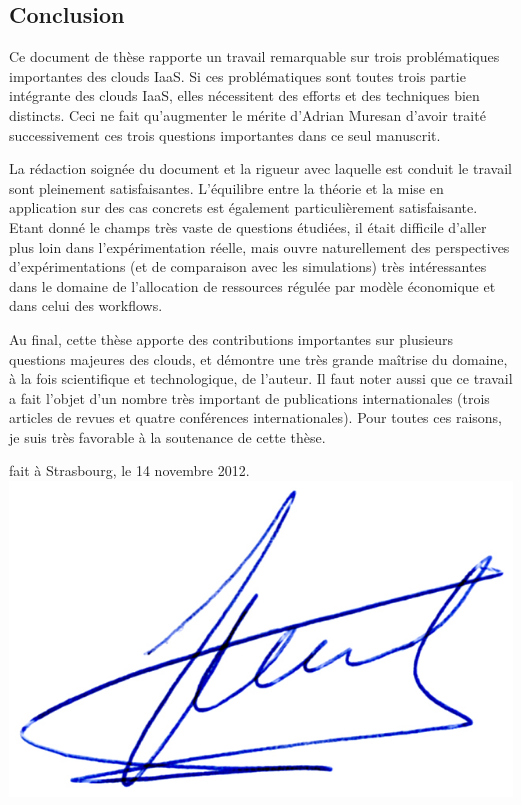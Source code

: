 \documentclass[a4paper,12pt]{article}
\begin{document}
\subsection*{Conclusion}
\vspace{-3mm}
Ce  document de  thèse rapporte un  travail remarquable  sur trois
problématiques importantes des  clouds IaaS.  Si ces  problématiques sont toutes
trois partie  intégrante des clouds IaaS,  elles nécessitent des efforts  et des
techniques bien distincts. Ceci ne  fait qu'augmenter le mérite d'Adrian Muresan
d'avoir  traité successivement  ces  trois questions  importantes  dans ce  seul
manuscrit.

La rédaction  soignée du  document et  la rigueur avec  laquelle est  conduit le
travail sont pleinement satisfaisantes. L'équilibre  entre la théorie et la mise
en   application   sur  des   cas   concrets   est  également   particulièrement
satisfaisante. Etant donné le champs très  vaste de questions étudiées, il était
difficile  d'aller   plus  loin   dans  l'expérimentation  réelle,   mais  ouvre
naturellement des  perspectives d'expérimentations  (et de comparaison  avec les
simulations) très  intéressantes dans le  domaine de l'allocation  de ressources
régulée par modèle économique et dans celui des workflows.

Au  final,  cette thèse  apporte  des  contributions importantes  sur  plusieurs
questions majeures des clouds, et démontre  une très grande maîtrise du domaine,
à la fois scientifique et technologique, de l'auteur. Il faut noter aussi que ce
travail   a  fait   l'objet   d'un  nombre   très   important  de   publications
internationales   (trois    articles   de    revues   et    quatre   conférences
internationales).   Pour  toutes  ces  raisons,  je suis  très  favorable  à  la
soutenance de cette thèse.


\begin{flushright}

{\small fait à Strasbourg, le 14 novembre 2012}.\\
\includegraphics[width=.16\textwidth]{signgenaud.jpg}
\end{flushright}
\end{document}
